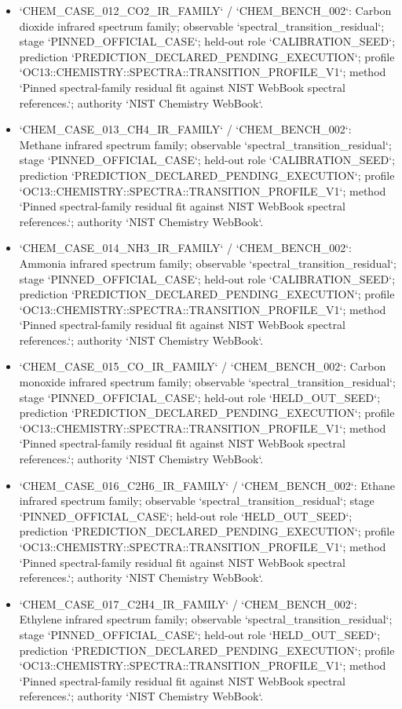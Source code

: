 \begin{itemize}
\item `CHEM\_CASE\_012\_CO2\_IR\_FAMILY` / `CHEM\_BENCH\_002`: Carbon dioxide infrared spectrum family; observable `spectral\_transition\_residual`; stage `PINNED\_OFFICIAL\_CASE`; held-out role `CALIBRATION\_SEED`; prediction `PREDICTION\_DECLARED\_PENDING\_EXECUTION`; profile `OC13::CHEMISTRY::SPECTRA::TRANSITION\_PROFILE\_V1`; method `Pinned spectral-family residual fit against NIST WebBook spectral references.`; authority `NIST Chemistry WebBook`.
\item `CHEM\_CASE\_013\_CH4\_IR\_FAMILY` / `CHEM\_BENCH\_002`: Methane infrared spectrum family; observable `spectral\_transition\_residual`; stage `PINNED\_OFFICIAL\_CASE`; held-out role `CALIBRATION\_SEED`; prediction `PREDICTION\_DECLARED\_PENDING\_EXECUTION`; profile `OC13::CHEMISTRY::SPECTRA::TRANSITION\_PROFILE\_V1`; method `Pinned spectral-family residual fit against NIST WebBook spectral references.`; authority `NIST Chemistry WebBook`.
\item `CHEM\_CASE\_014\_NH3\_IR\_FAMILY` / `CHEM\_BENCH\_002`: Ammonia infrared spectrum family; observable `spectral\_transition\_residual`; stage `PINNED\_OFFICIAL\_CASE`; held-out role `CALIBRATION\_SEED`; prediction `PREDICTION\_DECLARED\_PENDING\_EXECUTION`; profile `OC13::CHEMISTRY::SPECTRA::TRANSITION\_PROFILE\_V1`; method `Pinned spectral-family residual fit against NIST WebBook spectral references.`; authority `NIST Chemistry WebBook`.
\item `CHEM\_CASE\_015\_CO\_IR\_FAMILY` / `CHEM\_BENCH\_002`: Carbon monoxide infrared spectrum family; observable `spectral\_transition\_residual`; stage `PINNED\_OFFICIAL\_CASE`; held-out role `HELD\_OUT\_SEED`; prediction `PREDICTION\_DECLARED\_PENDING\_EXECUTION`; profile `OC13::CHEMISTRY::SPECTRA::TRANSITION\_PROFILE\_V1`; method `Pinned spectral-family residual fit against NIST WebBook spectral references.`; authority `NIST Chemistry WebBook`.
\item `CHEM\_CASE\_016\_C2H6\_IR\_FAMILY` / `CHEM\_BENCH\_002`: Ethane infrared spectrum family; observable `spectral\_transition\_residual`; stage `PINNED\_OFFICIAL\_CASE`; held-out role `HELD\_OUT\_SEED`; prediction `PREDICTION\_DECLARED\_PENDING\_EXECUTION`; profile `OC13::CHEMISTRY::SPECTRA::TRANSITION\_PROFILE\_V1`; method `Pinned spectral-family residual fit against NIST WebBook spectral references.`; authority `NIST Chemistry WebBook`.
\item `CHEM\_CASE\_017\_C2H4\_IR\_FAMILY` / `CHEM\_BENCH\_002`: Ethylene infrared spectrum family; observable `spectral\_transition\_residual`; stage `PINNED\_OFFICIAL\_CASE`; held-out role `HELD\_OUT\_SEED`; prediction `PREDICTION\_DECLARED\_PENDING\_EXECUTION`; profile `OC13::CHEMISTRY::SPECTRA::TRANSITION\_PROFILE\_V1`; method `Pinned spectral-family residual fit against NIST WebBook spectral references.`; authority `NIST Chemistry WebBook`.

\end{itemize}
